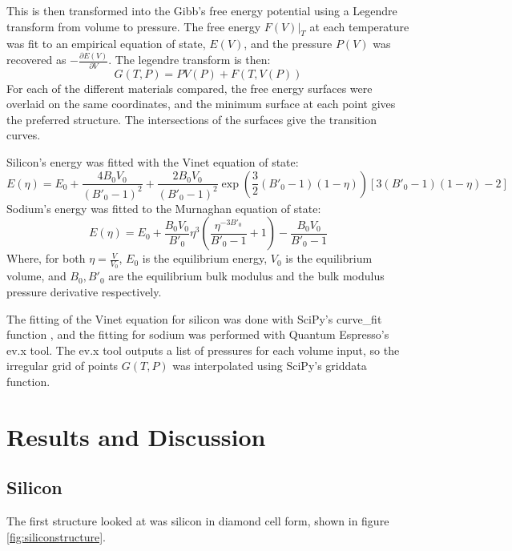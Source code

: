 \documentclass[12pt]{article}
\begin{document}
This is then transformed into the Gibb's free energy potential using a Legendre transform from volume to pressure. The free energy $F(V)|_T$ at each temperature was fit to an empirical equation of state, $E(V)$, and the pressure $P(V)$ was recovered as $-\frac{\partial E(V)}{\partial V}$. The legendre transform is then:
\begin{equation}
	G(T, P) = PV(P) + F(T, V(P))
\end{equation}
For each of the different materials compared, the free energy surfaces were overlaid on the same coordinates, and the minimum surface at each point gives the preferred structure. The intersections of the surfaces give the transition curves.

Silicon's energy was fitted with the Vinet equation of state:
\begin{equation}\label{eq:vinet}
E(\eta) = E_0 + \frac{4B_0V_0}{(B'_0-1)^2} + \frac{2B_0V_0}{(B'_0-1)^2}\exp{\left(\frac{3}{2}(B'_0-1)(1-\eta)\right)}[3(B'_0-1)(1-\eta)-2]
\end{equation}
Sodium's energy was fitted to the Murnaghan equation of state:
\begin{equation}\label{eq:bm}
E(\eta) = E_0+\frac{B_0V_0}{B'_0}\eta^3\left( \frac{\eta^{-3B'_0}}{B'_0-1}+1\right)-\frac{B_0V_0}{B'_0-1}
\end{equation}
Where, for both $\eta=\frac{V}{V_0}$, $E_0$ is the equilibrium energy, $V_0$ is the equilibrium volume, and $B_0, B'_0$ are the equilibrium bulk modulus and the bulk modulus pressure derivative respectively.

The fitting of the Vinet equation for silicon was done with SciPy's curve\_fit function \cite{scipy}, and the fitting for sodium was performed with Quantum Espresso's ev.x tool. The ev.x tool outputs a list of pressures for each volume input, so the irregular grid of points $G(T, P)$ was interpolated using SciPy's griddata function.
\section{Results and Discussion}
\subsection{Silicon}

The first structure looked at was silicon in diamond cell form, shown in figure \ref{fig:siliconstructure}.
\end{document}
